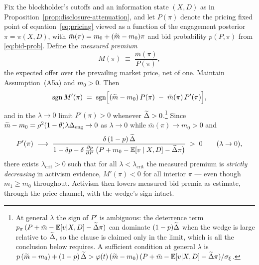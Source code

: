 \begin{proposition}
\label{prop:d7-afs}
Fix the blockholder's cutoffs and an information state $(X,D)$ as in Proposition~\ref{prop:disclosure-attenuation}, and let $P(\pi)$ denote the pricing fixed point of equation~\eqref{eq:pricing} viewed as a function of the engagement posterior $\pi=\pi(X,D)$, with $\bar m(\pi)=m_{0}+(\widetilde{m}-m_{0})\pi$ and bid probability $p(P,\pi)$ from \eqref{eq:bid-prob}. Define the \emph{measured premium}
\[
M(\pi)\;\equiv\;\frac{\bar m(\pi)}{P(\pi)} ,
\]
the expected offer over the prevailing market price, net of one. Maintain Assumption~\textup{(A5a)} and $m_{0}>0$. Then
\[
\operatorname{sgn} M'(\pi)\;=\;\operatorname{sgn}\Bigl[(\widetilde{m}-m_{0})\,P(\pi)\;-\;\bar m(\pi)\,P'(\pi)\Bigr],
\]
and in the $\lambda\to0$ limit $P'(\pi)>0$ whenever $\widetilde{\Delta}>0$.\footnote{At general $\lambda$ the sign of $P'$ is ambiguous: the deterrence term $p_{\pi}\,(P+\bar m-\mathbb{E}[v|X,D]-\widetilde{\Delta}\pi)$ can dominate $(1-p)\widetilde{\Delta}$ when the wedge is large relative to $\widetilde{\Delta}$, so the clause is claimed only in the limit, which is all the conclusion below requires. A sufficient condition at general $\lambda$ is $p\,(\widetilde{m}-m_{0})+(1-p)\,\widetilde{\Delta}>\varphi(t)\,(\widetilde{m}-m_{0})\,(P+\bar m-\mathbb{E}[v|X,D]-\widetilde{\Delta}\pi)/\sigma_{\xi}$.}
Since $\widetilde{m}-m_{0}=\rho^{2}(1-\theta)\lambda\Delta_{\mathrm{eng}}\to0$ as $\lambda\to0$ while $\bar m(\pi)\to m_{0}>0$ and
\[
P'(\pi)\;\longrightarrow\;\frac{\delta\,(1-p)\,\widetilde{\Delta}}{1-\delta p-\delta\,\frac{\partial p}{\partial P}\,\bigl(P+m_{0}-\mathbb{E}[v\mid X,D]-\widetilde{\Delta}\pi\bigr)}\;>\;0
\qquad(\lambda\to0),
\]
there exists $\lambda_{\mathrm{crit}}>0$ such that for all $\lambda<\lambda_{\mathrm{crit}}$ the measured premium is \emph{strictly decreasing} in activism evidence, $M'(\pi)<0$ for all interior $\pi$ --- even though $m_{1}\ge m_{0}$ throughout. Activism then lowers measured bid premia as \citet{CelentanoLevine2025} estimate, through the price channel, with the wedge's sign intact.
\end{proposition}

